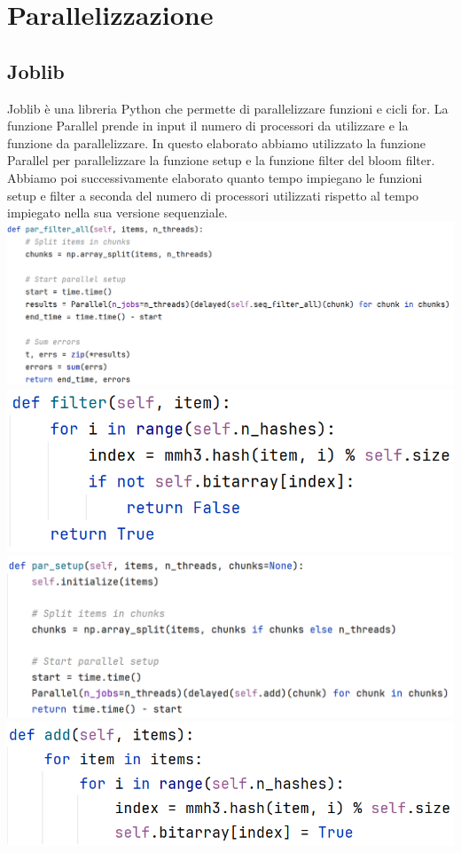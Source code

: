 \documentclass[11pt]{article}
\begin{document}
    \section{Parallelizzazione}\label{sec:parallelizazzione}
    \subsection{Joblib}\label{subsec:joblib}
    Joblib è una libreria Python che permette di parallelizzare funzioni e cicli for.
    La funzione Parallel prende in input il numero di processori da utilizzare e la funzione da parallelizzare.
    In questo elaborato abbiamo utilizzato la funzione Parallel per parallelizzare la funzione setup e la funzione filter del bloom filter.
    Abbiamo poi successivamente elaborato quanto tempo impiegano le funzioni setup e filter a seconda del numero di processori utilizzati rispetto al tempo impiegato nella sua versione sequenziale.
    \includegraphics[width=\textwidth]{../documentation/img/pycode/pycode (1)}
    \includegraphics[width=\textwidth]{../documentation/img/pycode/pycode (2)}
    \includegraphics[width=\textwidth]{../documentation/img/pycode/pycode (3)}
    \includegraphics[width=\textwidth]{../documentation/img/pycode/pycode (4)}
\end{document}
